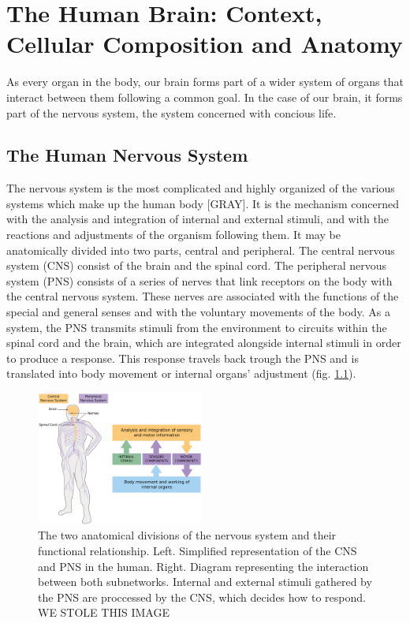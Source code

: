 
\chapter{The Human Brain: Context, Cellular Composition and Anatomy}

As every organ in the body, our brain forms part of a wider system of organs that interact between them following a common goal.
In the case of our brain, it forms part of the nervous system, the system concerned with concious life.

\section{The Human Nervous System}
The nervous system is the most complicated and highly organized of the various systems which make up the human body [GRAY].
It is the mechanism concerned with the analysis and integration of internal and external stimuli, and with the reactions and adjustments of the organism following them.
It may be anatomically divided into two parts, central and peripheral.
The central nervous system (CNS) consist of the brain and the spinal cord.
The peripheral nervous system (PNS) consists of a series of nerves that link receptors on the body with the central nervous system.
These nerves are associated with the functions of the special and general senses and with the voluntary movements of the body.
As a system, the PNS transmits stimuli from the environment to circuits within the spinal cord and the brain, which are integrated alongside internal stimuli in order to produce a response.
This response travels back trough the PNS and is translated into body movement or internal organs' adjustment (fig. \ref{fig:cns_and_pns}).

\begin{figure}[h!]                                                                                                                    
    \includegraphics[width=0.49\textwidth]{2.background/neuroanatomy/img/pns_and_cns.png}
    \caption{The two anatomical divisions of the nervous system and their functional relationship.
             Left. Simplified representation of the CNS and PNS in the human.
             Right. Diagram representing the interaction between both subnetworks. Internal and external stimuli gathered by the PNS are proccessed by the CNS, which decides how to respond.
             WE STOLE THIS IMAGE}
    \label{fig:cns_and_pns}
\end{figure}  


